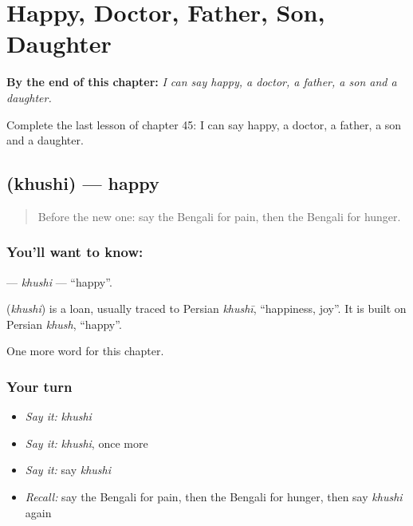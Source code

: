 
\chapter{Happy, Doctor, Father, Son, Daughter}
\label{ch:bn-happy-doctor-father-son-daughter}

\begin{chapteropening}
\textbf{By the end of this chapter:} \emph{I can say happy, a doctor, a father, a son and a daughter.}

Complete the last lesson of chapter 45: I can say happy, a doctor, a father, a son and a daughter.
\end{chapteropening}

\section[\texorpdfstring{\bn{খুশি} (khushi)}{খুশি (khushi)}]{ (khushi) — happy}

\label{lesson:BN-C45-khushi}



\begin{quote}
Before the new one: say the Bengali for pain, then the Bengali for hunger.
\end{quote}

\subsection*{You'll want to know: }
\textbf{} — \emph{khushi} — \textquotedblleft{}happy\textquotedblright{}.

\begin{cousinweb}
\textbf{} (\emph{khushi}) is a loan, usually traced to Persian \emph{khushī}, \textquotedblleft{}happiness, joy\textquotedblright{}. It is built on Persian \emph{khush}, \textquotedblleft{}happy\textquotedblright{}.
\end{cousinweb}

\begin{grammarlens}[title={What you've built}]
One more word for this chapter.
\end{grammarlens}

\subsection*{Your turn}
\begin{itemize}
\raggedright
  \item \emph{Say it:} \emph{khushi}
  \item \emph{Say it:} \emph{khushi}, once more
  \item \emph{Say it:} say \emph{khushi}
  \item \emph{Recall:} say the Bengali for pain, then the Bengali for hunger, then say \emph{khushi} again
\end{itemize}

